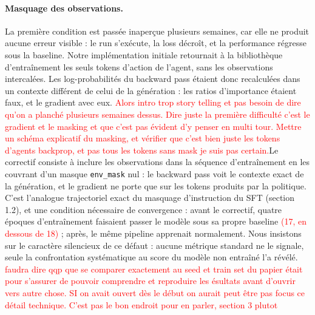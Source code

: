 \documentclass[11pt,a4paper]{article}
\begin{document}
\paragraph{Masquage des observations.} La première condition est passée inaperçue plusieurs semaines, car elle ne produit aucune erreur visible : le run s'exécute, la loss décroît, et la performance régresse sous la baseline. Notre implémentation initiale retournait à la bibliothèque d'entraînement les seuls tokens d'action de l'agent, sans les observations intercalées. Les log-probabilités du backward pass étaient donc recalculées dans un contexte différent de celui de la génération : les ratios d'importance étaient faux, et le gradient avec eux. \textcolor{red}{Alors intro trop story telling et pas besoin de dire qu'on a planché plusieurs semaines dessus. Dire juste la première difficulté c'est le gradient et le masking et que c'est pas évident d'y penser en multi tour. Mettre un schéma explicatif du masking, et vérifier que c'est bien juste les tokens d'agents backprop, et pas tous les tokens sans mask je suis pas certain.}Le correctif consiste à inclure les observations dans la séquence d'entraînement en les couvrant d'un masque \texttt{env\_mask} nul : le backward pass voit le contexte exact de la génération, et le gradient ne porte que sur les tokens produits par la politique. C'est l'analogue trajectoriel exact du masquage d'instruction du SFT (section 1.2), et une condition nécessaire de convergence : avant le correctif, quatre époques d'entraînement faisaient passer le modèle sous sa propre baseline \textcolor{red}{(17, en dessous de 18)} ; après, le même pipeline apprenait normalement. Nous insistons sur le caractère silencieux de ce défaut : aucune métrique standard ne le signale, seule la confrontation systématique au score du modèle non entraîné l'a révélé. \textcolor{red}{faudra dire qqp que se comparer exactement au seed et train set du papier était pour s'assurer de pouvoir comprendre et reproduire les ésultats avant d'ouvrir vers autre chose. SI on avait ouvert dès le début on aurait peut être pas focus ce détail technique. C'est pas le bon endroit pour en parler, section 3 plutot}
\end{document}
